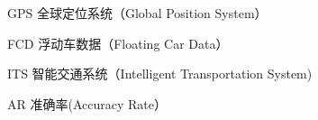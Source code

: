 \begin{denotation}[3cm]
\item[GPS] 全球定位系统（Global Position System）
\item[FCD] 浮动车数据（Floating Car Data）
\item[ITS] 智能交通系统（Intelligent Transportation System) 
\item[AR]准确率(Accuracy Rate）
\end{denotation}